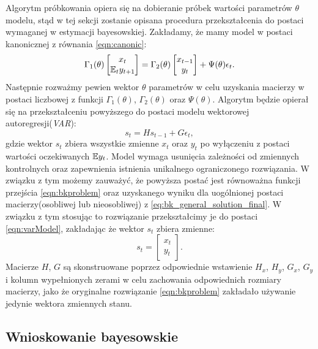 Algorytm próbkowania opiera się na dobieranie próbek wartości parametrów $\theta$ modelu, stąd w tej sekcji zostanie opisana procedura przekształcenia do postaci wymaganej w estymacji bayesowskiej. Zakładamy, że mamy model w postaci kanonicznej z równania \eqref{eqn:canonic}:
\begin{equation}
    \label{eqn:bayes_canonic}
    \Gamma_1(\theta) \begin{bmatrix}x_{t} \\ \mathbb{E}_t y_{t+1}\end{bmatrix} = \Gamma_2(\theta) \begin{bmatrix}x_{t-1} \\ y_{t}\end{bmatrix} + \Psi(\theta) \epsilon_t.
\end{equation}
Następnie rozważmy pewien wektor $\theta$ parametrów w celu uzyskania macierzy w postaci liczbowej z funkcji $\Gamma_1(\theta)$, $\Gamma_2(\theta)$ oraz $\Psi(\theta)$. Algorytm będzie opierał się na przekształceniu powyższego do postaci modelu wektorowej autoregresji(\emph{VAR}):
\begin{equation}
\label{eqn:varModel}
    s_t = H s_{t-1} + G \epsilon_t,
\end{equation}
gdzie wektor $s_t$ zbiera wszystkie zmienne $x_t$ oraz $y_t$ po wyłączeniu z postaci wartości oczekiwanych $\mathbb{E} y_t$. Model wymaga usunięcia zależności od zmiennych kontrolnych oraz zapewnienia istnienia unikalnego ograniczonego rozwiązania. W związku z tym możemy zauważyć, że powyższa postać jest równoważna funkcji przejścia \eqref{eqn:bkproblem} oraz uzyskanego wyniku dla uogólnionej postaci macierzy(osobliwej lub nieosobliwej) z \eqref{eq:bk_general_solution_final}. W związku z tym stosując to rozwiązanie przekształcimy je do postaci \eqref{eqn:varModel}, zakładając że wektor $s_t$ zbiera zmienne:
\begin{equation}
    s_t = \begin{bmatrix}x_{t} \\ y_{t}\end{bmatrix}.
\end{equation}
Macierze $H$, $G$ są skonstruowane poprzez odpowiednie wstawienie $H_x$, $H_y$, $G_x$, $G_y$ i kolumn wypełnionych zerami w celu zachowania odpowiednich rozmiary macierzy, jako że oryginalne rozwiązanie \eqref{eqn:bkproblem} zakładało używanie jedynie wektora zmiennych stanu.

\subsection{Wnioskowanie bayesowskie}

